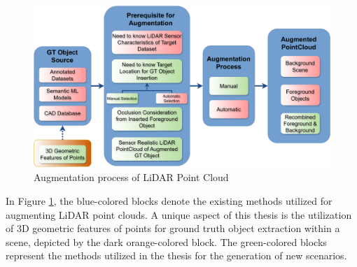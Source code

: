 \begin{figure}[htbp]
    \centering
    \includegraphics[width=1\linewidth]{97_graphics//related_work/related_work_block_diagram.pdf}
    \caption{Augmentation process of LiDAR Point Cloud}
    \label{fig:sota-related_work_block_diagram}
\end{figure}

In Figure \ref{fig:sota-related_work_block_diagram}, the blue-colored blocks denote the existing methods utilized for augmenting LiDAR point clouds. A unique aspect of this thesis is the utilization of 3D geometric features of points for ground truth object extraction within a scene, depicted by the dark orange-colored block. The green-colored blocks represent the methods utilized in the thesis for the generation of new scenarios.